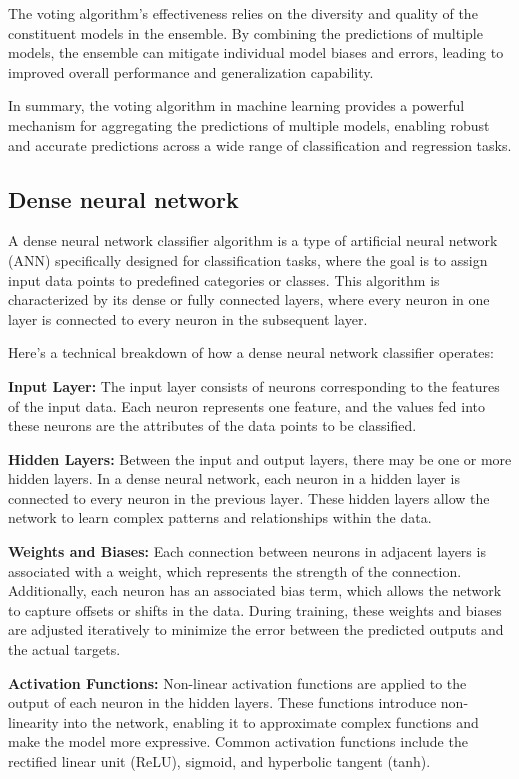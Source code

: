\documentclass[preprint,aps,nofootinbib,a4paper,superscriptaddress,longbibliography,amsfonts,amssymb,amsmath,titlepage]{revtex4-2}
\begin{document}
The voting algorithm's effectiveness relies on the diversity and quality of the constituent models in the ensemble. By combining the predictions of multiple models, the ensemble can mitigate individual model biases and errors, leading to improved overall performance and generalization capability.

In summary, the voting algorithm in machine learning provides a powerful mechanism for aggregating the predictions of multiple models, enabling robust and accurate predictions across a wide range of classification and regression tasks.

\subsection{Dense neural network}

A dense neural network classifier algorithm is a type of artificial neural network (ANN) specifically designed for classification tasks, where the goal is to assign input data points to predefined categories or classes. This algorithm is characterized by its dense or fully connected layers, where every neuron in one layer is connected to every neuron in the subsequent layer.

Here's a technical breakdown of how a dense neural network classifier operates:

\textbf{Input Layer:} The input layer consists of neurons corresponding to the features of the input data. Each neuron represents one feature, and the values fed into these neurons are the attributes of the data points to be classified.

\textbf{Hidden Layers:} Between the input and output layers, there may be one or more hidden layers. In a dense neural network, each neuron in a hidden layer is connected to every neuron in the previous layer. These hidden layers allow the network to learn complex patterns and relationships within the data.

\textbf{Weights and Biases:} Each connection between neurons in adjacent layers is associated with a weight, which represents the strength of the connection. Additionally, each neuron has an associated bias term, which allows the network to capture offsets or shifts in the data. During training, these weights and biases are adjusted iteratively to minimize the error between the predicted outputs and the actual targets.

\textbf{Activation Functions:} Non-linear activation functions are applied to the output of each neuron in the hidden layers. These functions introduce non-linearity into the network, enabling it to approximate complex functions and make the model more expressive. Common activation functions include the rectified linear unit (ReLU), sigmoid, and hyperbolic tangent (tanh).
\end{document}
